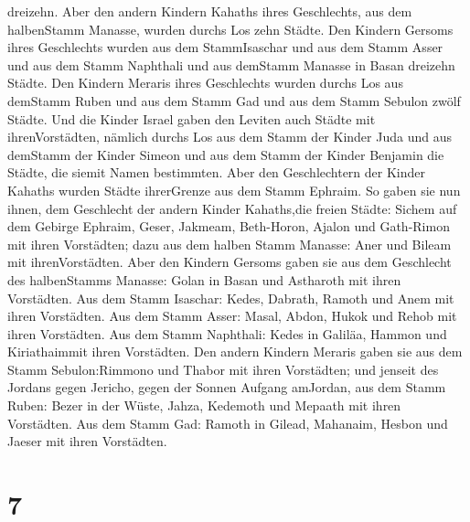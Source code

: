 dreizehn.  Aber den andern Kindern Kahaths ihres
Geschlechts, aus dem halbenStamm Manasse, wurden durchs Los zehn Städte.
 Den Kindern Gersoms ihres Geschlechts wurden aus dem
StammIsaschar und aus dem Stamm Asser und aus dem Stamm Naphthali und
aus demStamm Manasse in Basan dreizehn Städte.  Den Kindern
Meraris ihres Geschlechts wurden durchs Los aus demStamm Ruben und aus
dem Stamm Gad und aus dem Stamm Sebulon zwölf Städte.  Und
die Kinder Israel gaben den Leviten auch Städte mit ihrenVorstädten,
 nämlich durchs Los aus dem Stamm der Kinder Juda und aus
demStamm der Kinder Simeon und aus dem Stamm der Kinder Benjamin die
Städte, die siemit Namen bestimmten.  Aber den
Geschlechtern der Kinder Kahaths wurden Städte ihrerGrenze aus dem Stamm
Ephraim.  So gaben sie nun ihnen, dem Geschlecht der andern
Kinder Kahaths,die freien Städte: Sichem auf dem Gebirge Ephraim, Geser,
 Jakmeam, Beth-Horon,  Ajalon und Gath-Rimon
mit ihren Vorstädten;  dazu aus dem halben Stamm Manasse:
Aner und Bileam mit ihrenVorstädten.  Aber den Kindern
Gersoms gaben sie aus dem Geschlecht des halbenStamms Manasse: Golan in
Basan und Astharoth mit ihren Vorstädten.  Aus dem Stamm
Isaschar: Kedes, Dabrath,  Ramoth und Anem mit ihren
Vorstädten.  Aus dem Stamm Asser: Masal, Abdon,
 Hukok und Rehob mit ihren Vorstädten.  Aus
dem Stamm Naphthali: Kedes in Galiläa, Hammon und Kiriathaimmit ihren
Vorstädten.  Den andern Kindern Meraris gaben sie aus dem
Stamm Sebulon:Rimmono und Thabor mit ihren Vorstädten;  und
jenseit des Jordans gegen Jericho, gegen der Sonnen Aufgang amJordan,
aus dem Stamm Ruben: Bezer in der Wüste, Jahza,  Kedemoth
und Mepaath mit ihren Vorstädten.  Aus dem Stamm Gad:
Ramoth in Gilead, Mahanaim,  Hesbon und Jaeser mit ihren
Vorstädten.

\hypertarget{section-6}{%
\section{7}\label{section-6}}

